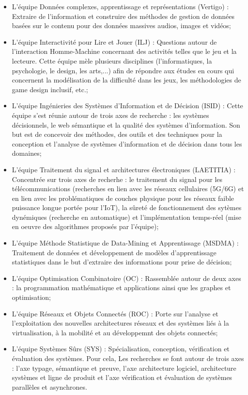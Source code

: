 \documentclass{article}
\begin{document}
	\begin{itemize}
		\item L'équipe Données complexes, apprentissage et représentations (Vertigo) : Extraire de l'information et construire des méthodes de gestion de données basées sur le contenu pour des données massives audios, images et vidéos;
		\item L'équipe Interactivité pour Lire et Jouer (ILJ) : Questions autour de l'interaction Homme-Machine concernant des activités telles que le jeu et la lecteure. Cette équipe mèle plusieurs disciplines (l'informatiques, la psychologie, le design, les arts,...) afin de répondre aux études en cours qui concernent la modélisation de la difficulté dans les jeux, les méthodologies de game design inclusif, etc.;
		\item L'équipe Ingénieries des Systèmes d'Information et de Décision (ISID) : Cette équipe s'est réunie autour de trois axes de recherche : les systèmes décisionnels, le web sémantique et la qualité des systèmes d'information. Son but est de concevoir des méthodes, des outils et des techniques	pour la conception et l'analyse de systèmes d'information et de décision dans tous les domaines;
		\item L'équipe Traitement du signal et architectures électroniques (LAETITIA) : Concentrée sur trois axes de recherhe : le traitement du signal pour les télécommunications (recherches en lien avec les réseaux cellulaires (5G/6G) et en lien avec les problématiques de couches physique pour les réseaux faible puissance longue portée pour l'IoT), la sûreté de fonctionnement des sytèmes dynémiques (recherche en automatique) et l'implémentation temps-réel (mise en oeuvre des algorithmes proposés par l'équipe);
		\item L'équipe Méthode Statistique de Data-Mining et Apprentissage (MSDMA) : Traitement de données et développement de modèles d'apprentissage statistiques dans le but d'extraire des informations pour prise de décision;
		\item L'équipe Optimisation Combinatoire (OC) : Rassemblée autour de deux axes : la programmation mathématique et applications ainsi que les graphes et optimisation;
		\item L'équipe Réseaux et Objets Connectés (ROC) : Porte sur l'analyse et l'exploitation des nouvelles architectures réseaux et des systèmes liés à la virtualisation, à la mobilité et au développemnt des objets connectés;
		\item L'équipe Systèmes Sûrs (SYS) : Spécialisation, conception, vérification et évaluation des systèmes. Pour cela, Les recherches se font autour de trois axes : l'axe typage, sémantique et preuve, l'axe architecture logiciel, architecture systèmes et ligne de produit et l'axe vérification et évaluation de systèmes parallèles et asynchrones.
	\end{itemize}
\end{document}
